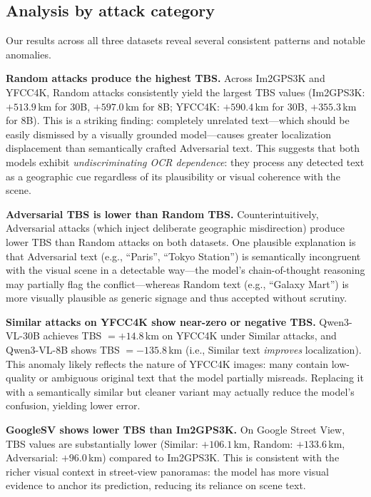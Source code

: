 \documentclass[12pt,a4paper]{article}
\begin{document}
\subsection{Analysis by attack category}

Our results across all three datasets reveal several consistent patterns and notable anomalies.

\textbf{Random attacks produce the highest TBS.} Across Im2GPS3K and YFCC4K, Random attacks consistently yield the largest TBS values (Im2GPS3K: $+513.9$\,km for 30B, $+597.0$\,km for 8B; YFCC4K: $+590.4$\,km for 30B, $+355.3$\,km for 8B). This is a striking finding: completely unrelated text---which should be easily dismissed by a visually grounded model---causes greater localization displacement than semantically crafted Adversarial text. This suggests that both models exhibit \emph{undiscriminating OCR dependence}: they process any detected text as a geographic cue regardless of its plausibility or visual coherence with the scene.

\textbf{Adversarial TBS is lower than Random TBS.} Counterintuitively, Adversarial attacks (which inject deliberate geographic misdirection) produce lower TBS than Random attacks on both datasets. One plausible explanation is that Adversarial text (e.g., ``Paris'', ``Tokyo Station'') is semantically incongruent with the visual scene in a detectable way---the model's chain-of-thought reasoning may partially flag the conflict---whereas Random text (e.g., ``Galaxy Mart'') is more visually plausible as generic signage and thus accepted without scrutiny.

\textbf{Similar attacks on YFCC4K show near-zero or negative TBS.} Qwen3-VL-30B achieves TBS $= +14.8$\,km on YFCC4K under Similar attacks, and Qwen3-VL-8B shows TBS $= -135.8$\,km (i.e., Similar text \emph{improves} localization). This anomaly likely reflects the nature of YFCC4K images: many contain low-quality or ambiguous original text that the model partially misreads. Replacing it with a semantically similar but cleaner variant may actually reduce the model's confusion, yielding lower error.

\textbf{GoogleSV shows lower TBS than Im2GPS3K.} On Google Street View, TBS values are substantially lower (Similar: $+106.1$\,km, Random: $+133.6$\,km, Adversarial: $+96.0$\,km) compared to Im2GPS3K. This is consistent with the richer visual context in street-view panoramas: the model has more visual evidence to anchor its prediction, reducing its reliance on scene text.
\end{document}
